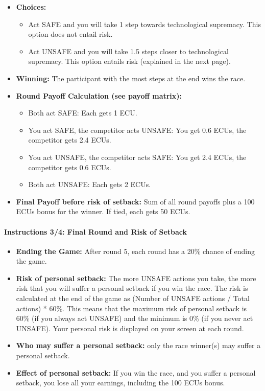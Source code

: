 \documentclass[pdflatex,sn-mathphys-ay]{sn-jnl}
\theoremstyle{thmstyleone}
\theoremstyle{thmstyletwo}
\theoremstyle{thmstylethree}
\begin{document}
\begin{itemize}
    \item \textbf{Choices:}
    \begin{itemize}
        \item Act SAFE and you will take 1 step towards technological supremacy. This option does not entail risk.
        \item Act UNSAFE and you will take 1.5 steps closer to technological supremacy. This option entails risk (explained in the next page).
    \end{itemize}
    \item \textbf{Winning:} The participant with the most steps at the end wins the race.
    \item \textbf{Round Payoff Calculation (see payoff matrix):}
    \begin{itemize}
        \item Both act SAFE: Each gets 1 ECU.
        \item You act SAFE, the competitor acts UNSAFE: You get 0.6 ECUs, the competitor gets 2.4 ECUs.
        \item You act UNSAFE, the competitor acts SAFE: You get 2.4 ECUs, the competitor gets 0.6 ECUs.
        \item Both act UNSAFE: Each gets 2 ECUs.
    \end{itemize}
    \item \textbf{Final Payoff before risk of setback:} Sum of all round payoffs plus a 100 ECUs bonus for the winner. If tied, each gets 50 ECUs.
\end{itemize}


\paragraph{Instructions 3/4: Final Round and Risk of Setback}

\begin{itemize}
    \item \textbf{Ending the Game:} After round 5, each round has a 20\% chance of ending the game.
    \item \textbf{Risk of personal setback:} The more UNSAFE actions you take, the more risk that you will suffer a personal setback if you win the race. The risk is calculated at the end of the game as (Number of UNSAFE actions / Total actions) * 60\%. This means that the maximum risk of personal setback is 60\% (if you always act UNSAFE) and the minimum is 0\% (if you never act UNSAFE). Your personal risk is displayed on your screen at each round.
    \item \textbf{Who may suffer a personal setback:} only the race winner(s) may suffer a personal setback.
    \item \textbf{Effect of personal setback:} If you win the race, and you suffer a personal setback, you lose all your earnings, including the 100 ECUs bonus.
\end{itemize}
\end{document}
